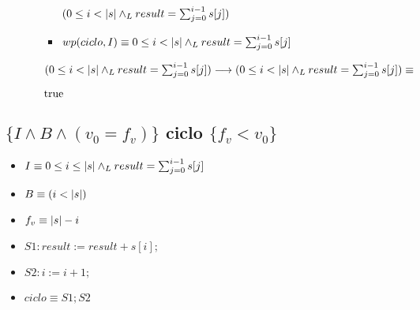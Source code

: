 \documentclass{article}
\begin{document}
\begin{itemize}
\begin{itemize}
\begin{itemize}
            $(0 \leq i < |s| \land _L result = \sum_{j=0}^{i-1} s[j])$

            \item $wp(ciclo, I) \equiv 0 \leq i < |s| \land _L result = \sum_{j=0}^{i-1} s[j]$

        \end{itemize}

        $(0 \leq i < |s| \land _L result = \sum_{j=0}^{i-1} s[j]) \longrightarrow 
        (0 \leq i < |s| \land _L result = \sum_{j=0}^{i-1} s[j]) \equiv$

        $\mathrm{true}$


    \end{itemize}

\end{itemize}

\subsection*{$\{I \wedge B \wedge (v_{0} = f_{v})\}$ ciclo $\{f_{v} < v_{0}\}$}

\begin{itemize}
    \item $I \equiv 0 \leq i \leq |s| \land _L result = \sum_{j=0}^{i-1} s[j]$
    \item $B \equiv (i < |s|)$
    \item $f_{v} \equiv |s|-i$
    \item $S1: result := result + s[i];$
    \item $S2: i := i + 1;$
    \item $ciclo \equiv S1; S2$
\end{itemize}
\end{document}
